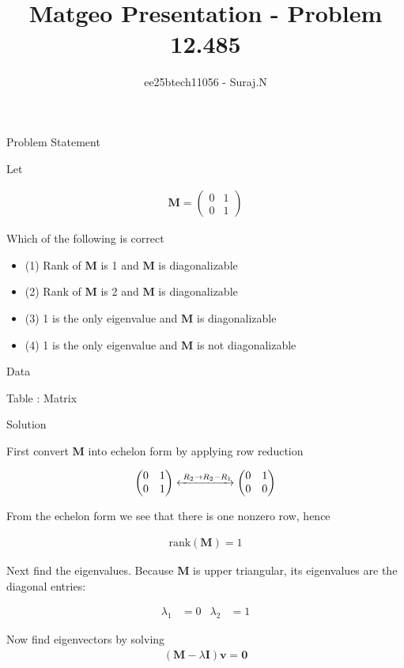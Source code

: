 \documentclass{beamer}
\title{Matgeo Presentation - Problem 12.485}
\author{ee25btech11056 - Suraj.N}
\numberwithin{equation}{section}
\theoremstyle{remark}
\newcommand{\myvec}[1]{\ensuremath{\begin{pmatrix}#1\end{pmatrix}}}
\let\vec\mathbf
\begin{document}
\begin{frame}
  \titlepage
\end{frame}

\begin{frame}{Problem Statement}

Let 

\begin{align*}
  \vec{M} = \myvec{0 & 1\\0 & 1}
\end{align*}

Which of the following is correct 
\begin{itemize}
  \item (1) Rank of $\vec{M}$ is 1 and $\vec{M}$ is diagonalizable
  \item (2) Rank of $\vec{M}$ is 2 and $\vec{M}$ is diagonalizable
  \item (3) 1 is the only eigenvalue and $\vec{M}$ is diagonalizable
  \item (4) 1 is the only eigenvalue and $\vec{M}$ is not diagonalizable
\end{itemize}

\end{frame}

\begin{frame}{Data}

\begin{table}[h!]
  \centering
  
  \caption*{Table : Matrix}
  \label{12.485}
\end{table}

\end{frame}

\begin{frame}{Solution}

First convert $\vec{M}$ into echelon form by applying row reduction

\begin{align}
\myvec{0 & 1 \\ 0 & 1}
\xleftrightarrow{\;R_2 \to R_2 - R_1}
\myvec{0 & 1 \\ 0 & 0}
\end{align}

From the echelon form we see that there is one nonzero row, hence

\begin{align}
\text{rank}(\vec{M}) = 1
\end{align}

Next find the eigenvalues. Because $\vec{M}$ is upper triangular, its eigenvalues are the diagonal entries:

\begin{align}
  \lambda_1 &= 0 & \lambda_2 &= 1 
\end{align}

Now find eigenvectors by solving 
\begin{align}
  (\vec{M}-\lambda \vec{I})\vec{v} = \vec{0}
\end{align}

\end{frame}
\end{document}
